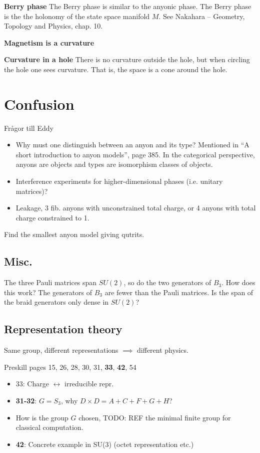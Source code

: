 \documentclass[a4paper,10pt,oneside]{book}
\theoremstyle{plain}
\theoremstyle{definition}
\theoremstyle{remark}
\begin{document}
{\textbf{Berry phase} The Berry phase is similar to the anyonic phase. The Berry phase is the the holonomy of the state space manifold $M$. See Nakahara -- Geometry, Topology and Physics, chap. 10.

\textbf{Magnetism is a curvature}

\textbf{Curvature in a hole} There is no curvature outside the hole, but when circling the hole one sees curvature. That is, the space is a cone around the hole.




\chapter{Confusion}

Frågor till Eddy

\begin{itemize}
  \item Why must one distinguish between an anyon and its type? Mentioned in ``A short introduction to anyon models'', page 385. In the categorical perspective, anyons are objects and types are isomorphism classes of objects.
  \item Interference experiments for higher-dimensional phases (i.e. unitary matrices)?
  \item Leakage, 3 fib. anyons with unconstrained total charge, or 4 anyons with total charge constrained to 1.
\end{itemize}

Find the smallest anyon model giving qutrits.

\section{Misc.}

The three Pauli matrices span $SU(2)$, so do the two generators of $B_3$. How does this work? The generators of $B_3$ are fewer than the Pauli matrices. Is the span of the braid generators only dense in $SU(2)$?

\section{Representation theory}

Same group, different representations $\implies$ different physics.

Preskill pages 15, 26, 28, 30, 31, \textbf{33}, \textbf{42}, 54

\begin{itemize}
  \item 33: Charge $\leftrightarrow$ irreducible repr.
  \item \textbf{31-32}: $G = S_3$, why $D \times D = A + C + F + G + H$?
  \item How is the group $G$ chosen, TODO: REF the minimal finite group for classical computation.
  \item \textbf{42}: Concrete example in SU(3) (octet representation etc.)
\end{itemize}

}
\end{document}
